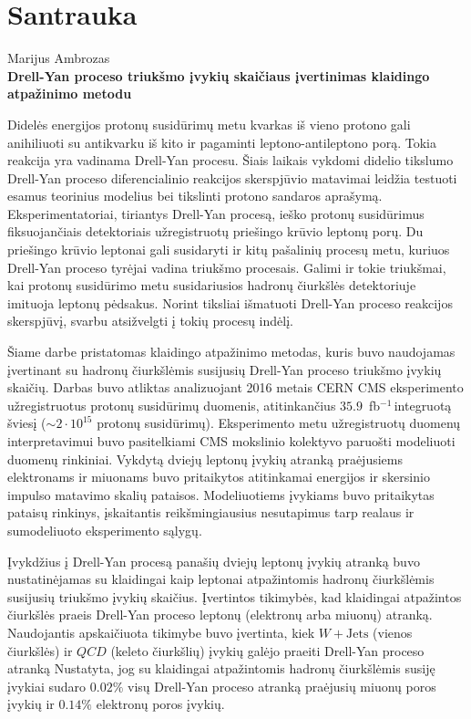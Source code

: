 \documentclass[a4paper, 12pt, oneside]{article}
\newcommand{\WJets}{W\! +\!\mathrm{Jets}}
\newcommand{\invfb}{fb$^{-1}\,$}
\newcommand{\QCD}{QC\! D}
\begin{document}
\newpage
\section*{Santrauka}
\begin{centering}
Marijus Ambrozas\\
\textbf{Drell-Yan proceso triukšmo įvykių skaičiaus įvertinimas klaidingo atpažinimo metodu}\\
\end{centering}
\vspace{0.5cm}

Didelės energijos protonų susidūrimų metu kvarkas iš vieno protono gali anihiliuoti su antikvarku iš kito ir pagaminti
leptono-antileptono porą.
Tokia reakcija yra vadinama Drell-Yan procesu.
Šiais laikais vykdomi didelio tikslumo Drell-Yan proceso diferencialinio reakcijos skerspjūvio matavimai leidžia
testuoti esamus teorinius modelius bei tikslinti protono sandaros aprašymą.
Eksperimentatoriai, tiriantys Drell-Yan procesą, ieško protonų susidūrimus fiksuojančiais detektoriais užregistruotų
priešingo krūvio leptonų porų.
Du priešingo krūvio leptonai gali susidaryti ir kitų pašalinių procesų metu, kuriuos Drell-Yan proceso tyrėjai vadina
triukšmo procesais.
Galimi ir tokie triukšmai, kai protonų susidūrimo metu susidariusios hadronų čiurkšlės detektoriuje imituoja leptonų pėdsakus.
Norint tiksliai išmatuoti Drell-Yan proceso reakcijos skerspjūvį, svarbu atsižvelgti į tokių procesų indėlį.

Šiame darbe pristatomas klaidingo atpažinimo metodas, kuris buvo naudojamas įvertinant su hadronų čiurkšlėmis susijusių
Drell-Yan proceso triukšmo įvykių skaičių.
Darbas buvo atliktas analizuojant 2016 metais CERN CMS eksperimento užregistruotus protonų susidūrimų duomenis,
atitinkančius $35.9$~\invfb integruotą šviesį ($\sim\!2 \cdot 10^{15}$ protonų susidūrimų).
Eksperimento metu užregistruotų duomenų interpretavimui buvo pasitelkiami CMS mokslinio kolektyvo paruošti
modeliuoti duomenų rinkiniai.
Vykdytą dviejų leptonų įvykių atranką praėjusiems elektronams ir miuonams buvo pritaikytos atitinkamai energijos ir
skersinio impulso matavimo skalių pataisos.
Modeliuotiems įvykiams buvo pritaikytas pataisų rinkinys, įskaitantis reikšmingiausius nesutapimus tarp realaus ir sumodeliuoto
eksperimento sąlygų.

Įvykdžius į Drell-Yan procesą panašių dviejų leptonų įvykių atranką buvo nustatinėjamas su klaidingai kaip leptonai atpažintomis
hadronų čiurkšlėmis susijusių triukšmo įvykių skaičius.
Įvertintos tikimybės, kad klaidingai atpažintos čiurkšlės praeis Drell-Yan proceso leptonų (elektronų arba miuonų) atranką.
Naudojantis apskaičiuota tikimybe buvo įvertinta, kiek $\WJets$ (vienos čiurkšlės) ir $\QCD$ (keleto čiurkšlių)
įvykių galėjo praeiti Drell-Yan proceso atranką
Nustatyta, jog su klaidingai atpažintomis hadronų čiurkšlėmis susiję įvykiai sudaro $0.02\%$ visų Drell-Yan proceso atranką
praėjusių miuonų poros įvykių ir $0.14\%$ elektronų poros įvykių.
\end{document}
